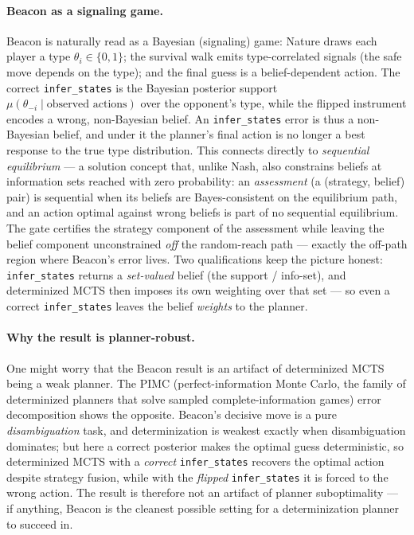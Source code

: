 \documentclass[11pt]{article}
\theoremstyle{remark}
\begin{document}
\paragraph{Beacon as a signaling game.} Beacon is naturally read as a Bayesian (signaling) game: Nature draws each player a type $\theta_i \in \{0,1\}$; the survival walk emits type-correlated signals (the safe move depends on the type); and the final guess is a belief-dependent action. The correct \texttt{infer\_states} is the Bayesian posterior support $\mu(\theta_{-i} \mid \text{observed actions})$ over the opponent's type, while the flipped instrument encodes a wrong, non-Bayesian belief. An \texttt{infer\_states} error is thus a non-Bayesian belief, and under it the planner's final action is no longer a best response to the true type distribution. This connects directly to \emph{sequential equilibrium} \citep{kreps1982sequential} --- a solution concept that, unlike Nash, also constrains beliefs at information sets reached with zero probability: an \emph{assessment} (a (strategy, belief) pair) is sequential when its beliefs are Bayes-consistent on the equilibrium path, and an action optimal against wrong beliefs is part of no sequential equilibrium. The gate certifies the strategy component of the assessment while leaving the belief component unconstrained \emph{off} the random-reach path --- exactly the off-path region where Beacon's error lives. Two qualifications keep the picture honest: \texttt{infer\_states} returns a \emph{set-valued} belief (the support / info-set), and determinized MCTS then imposes its own weighting over that set --- so even a correct \texttt{infer\_states} leaves the belief \emph{weights} to the planner.

\paragraph{Why the result is planner-robust.} One might worry that the Beacon result is an artifact of determinized MCTS being a weak planner. The PIMC (perfect-information Monte Carlo, the family of determinized planners that solve sampled complete-information games) error decomposition \citep{long2010pimc} shows the opposite. Beacon's decisive move is a pure \emph{disambiguation} task, and determinization is weakest exactly when disambiguation dominates; but here a correct posterior makes the optimal guess deterministic, so determinized MCTS with a \emph{correct} \texttt{infer\_states} recovers the optimal action despite strategy fusion, while with the \emph{flipped} \texttt{infer\_states} it is forced to the wrong action. The result is therefore not an artifact of planner suboptimality --- if anything, Beacon is the cleanest possible setting for a determinization planner to succeed in.
\end{document}
